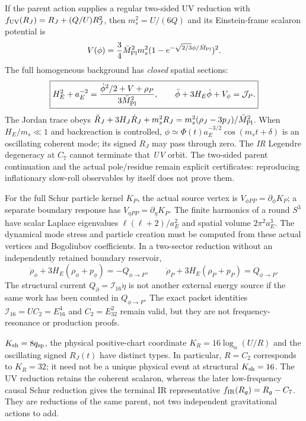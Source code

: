 \documentclass[12pt,a4paper]{article}
\begin{document}
\begin{theorem}
\label{p8:thm:v2219-closed-uv-oscillator}
If the parent action supplies a regular two-sided UV reduction with
$f_{\rm UV}(R_J)=R_J+(Q/U)R_J^2$, then
$m_s^2=U/(6Q)$ and its Einstein-frame scalaron potential is
\[
 V(\phi)=\frac34\bar M_{\rm Pl}^2m_s^2
 (1-e^{-\sqrt{2/3}\phi/\bar M_{\rm Pl}})^2.
\]
The full homogeneous background has \emph{closed} spatial sections:
\[
\boxed{H_E^2+a_E^{-2}=
\frac{\dot\phi^2/2+V+\rho_P}{3\bar M_{\rm Pl}^2},\qquad
\ddot\phi+3H_E\dot\phi+V_\phi=\mathcal J_P.}
\]
The Jordan trace obeys
$\ddot R_J+3H_J\dot R_J+m_s^2R_J
 =m_s^2(\rho_J-3p_J)/\bar M_{\rm Pl}^2$.
When $H_E/m_s\ll1$ and backreaction is controlled,
$\phi\simeq\Phi(t)a_E^{-3/2}\cos(m_st+\delta)$ is an
oscillating coherent mode; its signed $R_J$ may pass through zero.
The \emph{IR} Legendre degeneracy at $C_7$ cannot terminate that
\emph{UV} orbit.  The two-sided parent continuation and the actual
pole/residue remain explicit certificates: reproducing inflationary
slow-roll observables by itself does not prove them.
\end{theorem}
\begin{proposition}
\label{p8:prop:v2219-particle-work}
For the full Schur particle kernel $K_P$, the actual source vertex is
$V_{\phi PP}=\partial_\phi K_P$; a separate boundary response has
$V_{\eta PP}=\partial_\eta K_P$.  The finite harmonics of a round
$S^3$ have scalar Laplace eigenvalues $\ell(\ell+2)/a_E^2$ and
spatial volume $2\pi^2a_E^3$.  The dynamical mode stress and particle
creation must be computed from these actual vertices and Bogoliubov
coefficients. In a two-sector reduction without an independently retained
boundary reservoir,
\[
 \dot\rho_\phi+3H_E(\rho_\phi+p_\phi)=-Q_{\phi\to P},\qquad
 \dot\rho_P+3H_E(\rho_P+p_P)=Q_{\phi\to P}.
\]
The structural current $Q_\partial=\mathcal I_{16}\dot\eta$ is not
another external energy source if the same work has been counted in
$Q_{\phi\to P}$.  The exact packet identities
$\mathcal I_{16}=UC_2=E_{16}^4$ and $C_2=E_{32}^2$ remain valid,
but they are not frequency-resonance or production proofs.
\end{proposition}
\begin{remark}
$K_{\rm sh}=8q_{\rm sp}$, the physical positive-chart coordinate
$K_R=16\log_\alpha(U/R)$ and the oscillating signed $R_J(t)$ have
distinct types.  In particular, $R=C_2$ corresponds to $K_R=32$;
it need not be a unique physical event at structural $K_{\rm sh}=16$.
The UV reduction retains the coherent scalaron, whereas the later
low-frequency causal Schur reduction gives the terminal IR representative
$f_{\rm IR}(R_g)=R_g-C_7$.  They are reductions of the same parent,
not two independent gravitational actions to add.
\end{remark}
\end{document}

